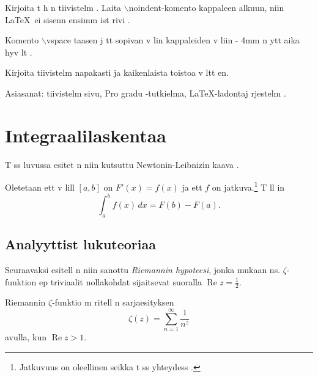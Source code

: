 \documentclass{article}
\begin{document}
\vspace{4mm}\noindent Kirjoita t h n tiivistelm . Laita $\backslash${noindent}-komento kappaleen
alkuun, niin \LaTeX\, ei sisenn  ensimm ist  rivi .

\vspace{4mm}\noindent Komento $\backslash$vspace taasen j tt  sopivan v lin kappaleiden v liin - 4mm n ytt  aika hyv lt .

\vspace{4mm}\noindent Kirjoita tiivistelm  napakasti ja kaikenlaista toistoa v ltt en.

\vspace{4mm}\noindent Asiasanat: tiivistelm sivu, Pro gradu -tutkielma, \LaTeX-ladontaj rjestelm .










\pagestyle{plain} 

\section{Integraalilaskentaa}

T ss  luvussa esitet n niin kutsuttu Newtonin-Leibnizin kaava \cite{NewtLeib}.

\begin{theorem} Oletetaan ett  v lill  $[a,b]$ on $F'(x)=f(x)$ ja ett  $f$ on jatkuva.\footnote{Jatkuvuus on oleellinen seikka t ss  yhteydess .} T ll in
\[
\int_a^bf(x)\,dx=F(b)-F(a).
\]
\end{theorem}

\subsection{Analyyttist  lukuteoriaa}

Seuraavaksi esitell n niin sanottu {\em Riemannin hypoteesi}, jonka mukaan ns. $\zeta$-funktion ep triviaalit nollakohdat sijaitsevat suoralla $\operatorname{Re}z=\frac12$.
\begin{definition} Riemannin $\zeta$-funktio m ritell n sarjaesityksen \cite{Riemann}
\[
\zeta(z)=\sum_{n=1}^{\infty}\frac{1}{n^z}
\]
avulla, kun $\operatorname{Re}z>1$.
\end{definition}
\end{document}
